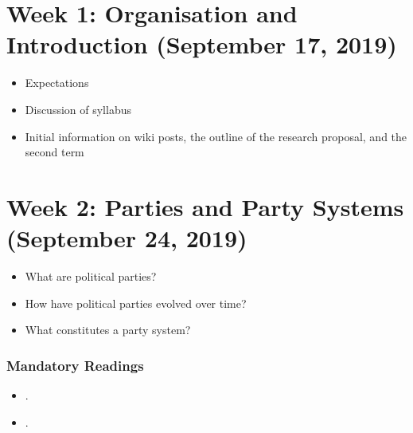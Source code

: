 \documentclass[abstract=on,parskip=full,headings=standardclasses,fontsize=11pt,paper=a4]{scrartcl}
\begin{document}
\begin{itemize}
\end{itemize}



\newpage

\tableofcontents

\section{Week 1: Organisation and Introduction (September 17, 2019)}

\begin{itemize}
\renewcommand\labelitemi{--}
\item Expectations
\item Discussion of syllabus
\item Initial information on wiki posts, the outline of the  research proposal, and the second term 
\end{itemize}


\section{Week 2: Parties and Party Systems (September 24, 2019)}

\begin{itemize}
\renewcommand\labelitemi{--}
\item  What are political parties?
\item How have political parties evolved over time?
\item What constitutes a party system?
\end{itemize}

\subsubsection*{Mandatory Readings}
\begin{itemize}
\item {}.
\item {}.
\end{itemize}
\end{document}
